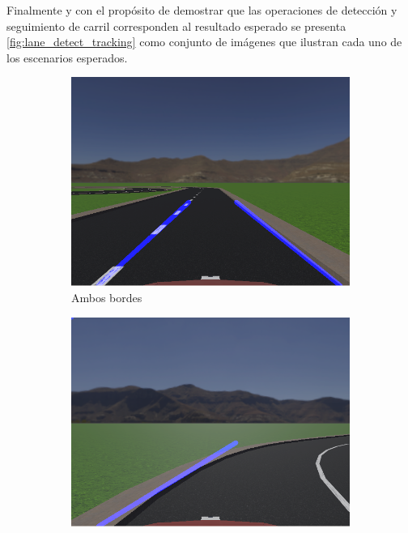 Finalmente y con el propósito de demostrar que las operaciones de detección y seguimiento de carril corresponden al resultado esperado se presenta \ref{fig:lane_detect_tracking} como conjunto de imágenes que ilustran cada uno de los escenarios esperados.

\begin{figure}[h]
    \centering
    \begin{subfigure}[b]{0.2\textwidth}
         \centering
         \includegraphics[width=\textwidth]{Figures/Figures_Cap04/both_bordes_detected.png}
         \caption{Ambos bordes}
         \label{fig:both_borders_detected}
    \end{subfigure}
    \hfill
    \begin{subfigure}[b]{0.2\textwidth}
         \centering
         \includegraphics[width=\textwidth]{Figures/Figures_Cap04/left_border_detected.png}

\end{subfigure}
\end{figure}
